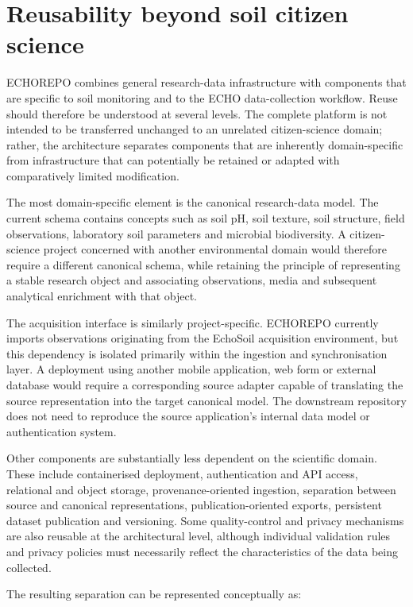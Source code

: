 \section{Reusability beyond soil citizen science}

ECHOREPO combines general research-data infrastructure with components that are specific to soil monitoring and to the ECHO data-collection workflow. Reuse should therefore be understood at several levels. The complete platform is not intended to be transferred unchanged to an unrelated citizen-science domain; rather, the architecture separates components that are inherently domain-specific from infrastructure that can potentially be retained or adapted with comparatively limited modification.

The most domain-specific element is the canonical research-data model. The current schema contains concepts such as soil pH, soil texture, soil structure, field observations, laboratory soil parameters and microbial biodiversity. A citizen-science project concerned with another environmental domain would therefore require a different canonical schema, while retaining the principle of representing a stable research object and associating observations, media and subsequent analytical enrichment with that object.

The acquisition interface is similarly project-specific. ECHOREPO currently imports observations originating from the EchoSoil acquisition environment, but this dependency is isolated primarily within the ingestion and synchronisation layer. A deployment using another mobile application, web form or external database would require a corresponding source adapter capable of translating the source representation into the target canonical model. The downstream repository does not need to reproduce the source application's internal data model or authentication system.

Other components are substantially less dependent on the scientific domain. These include containerised deployment, authentication and API access, relational and object storage, provenance-oriented ingestion, separation between source and canonical representations, publication-oriented exports, persistent dataset publication and versioning. Some quality-control and privacy mechanisms are also reusable at the architectural level, although individual validation rules and privacy policies must necessarily reflect the characteristics of the data being collected.

The resulting separation can be represented conceptually as:

